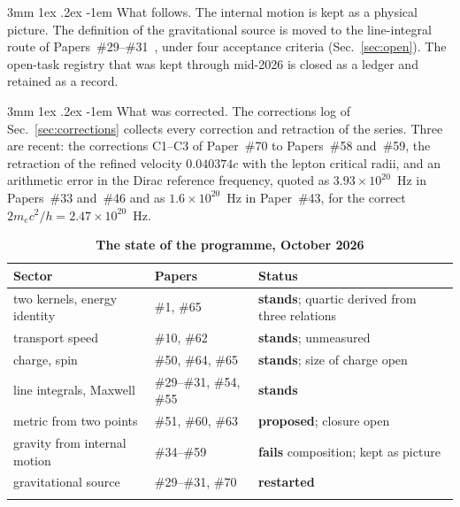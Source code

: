 \documentclass[%
 reprint, amsmath,amssymb, aps, prb, ]{revtex4-2}
\makeatletter
\numberwithin{equation}{section}
\renewcommand\paragraph{%
  \@startsection{paragraph}{4}{\z@}%
    {3mm \@plus 1ex \@minus .2ex}%
    {-1em}%
    {\normalfont\normalsize\itshape}}
\makeatother
\begin{document}
\paragraph{What follows.} The internal motion is kept as a physical picture. The definition of the gravitational source is moved to the line-integral route of Papers~\#29--\#31~\cite{hanamura29,hanamura30,hanamura31}, under four acceptance criteria (Sec.~\ref{sec:open}). The open-task registry that was kept through mid-2026 is closed as a ledger and retained as a record.

\paragraph{What was corrected.} The corrections log of Sec.~\ref{sec:corrections} collects every correction and retraction of the series. Three are recent: the corrections C1--C3 of Paper~\#70 to Papers~\#58 and~\#59, the retraction of the refined velocity $0.040374c$ with the lepton critical radii, and an arithmetic error in the Dirac reference frequency, quoted as $3.93\times10^{20}$~Hz in Papers~\#33 and~\#46 and as $1.6\times10^{20}$~Hz in Paper~\#43, for the correct $2m_ec^{2}/h = 2.47\times10^{20}$~Hz.

\begin{table}[t!]
\centering
\caption{\textbf{The state of the programme, October 2026}}
\label{tab:stand}
\renewcommand{\arraystretch}{1.35}
\setlength{\tabcolsep}{5pt}
\begin{tabular}{>{\raggedright\arraybackslash}p{2.9cm}>{\raggedright\arraybackslash}p{1.4cm}>{\raggedright\arraybackslash}p{3.1cm}}
\toprule
\textbf{Sector} & \textbf{Papers} & \textbf{Status} \\
\midrule
two kernels, energy identity & \#1, \#65 & \textcolor{pass}{\textbf{stands}}; quartic derived from three relations \\
\addlinespace[0.15cm]
transport speed & \#10, \#62 & \textcolor{pass}{\textbf{stands}}; unmeasured \\
\addlinespace[0.15cm]
charge, spin & \#50, \#64, \#65 & \textcolor{pass}{\textbf{stands}}; size of charge open \\
\addlinespace[0.15cm]
line integrals, Maxwell & \#29--\#31, \#54, \#55 & \textcolor{pass}{\textbf{stands}} \\
\addlinespace[0.15cm]
metric from two points & \#51, \#60, \#63 & \textcolor{kB}{\textbf{proposed}}; closure open \\
\addlinespace[0.15cm]
gravity from internal motion & \#34--\#59 & \textcolor{fail}{\textbf{fails}} composition; kept as picture \\
\addlinespace[0.15cm]
gravitational source & \#29--\#31, \#70 & \textcolor{kB}{\textbf{restarted}} \\
\addlinespace[0.1cm]
\bottomrule
\end{tabular}
\end{table}
\end{document}

